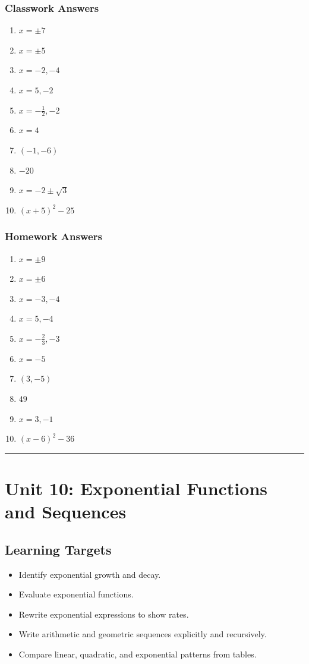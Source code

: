 \documentclass[11pt]{book}
\begin{document}
\subsection{Classwork Answers}

\begin{enumerate}
\item \(x=\pm7\)
\item \(x=\pm5\)
\item \(x=-2,-4\)
\item \(x=5,-2\)
\item \(x=-\frac12,-2\)
\item \(x=4\)
\item \((-1,-6)\)
\item \(-20\)
\item \(x=-2\pm\sqrt3\)
\item \((x+5)^2-25\)
\end{enumerate}

\subsection{Homework Answers}

\begin{enumerate}
\item \(x=\pm9\)
\item \(x=\pm6\)
\item \(x=-3,-4\)
\item \(x=5,-4\)
\item \(x=-\frac23,-3\)
\item \(x=-5\)
\item \((3,-5)\)
\item \(49\)
\item \(x=3,-1\)
\item \((x-6)^2-36\)
\end{enumerate}

\bigskip\hrule\bigskip

\chapter{Unit 10: Exponential Functions and Sequences}

\section{Learning Targets}

\begin{itemize}
\item Identify exponential growth and decay.
\item Evaluate exponential functions.
\item Rewrite exponential expressions to show rates.
\item Write arithmetic and geometric sequences explicitly and recursively.
\item Compare linear, quadratic, and exponential patterns from tables.
\end{itemize}
\end{document}
